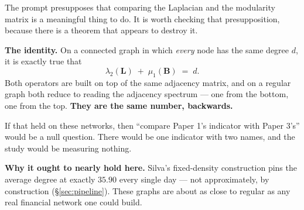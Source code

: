 \documentclass[11pt,a4paper]{article}
\newcommand{\Lap}{\mathbf{L}}
\newcommand{\Bmat}{\mathbf{B}}
\begin{document}
The prompt presupposes that comparing the Laplacian and the modularity matrix
is a meaningful thing to do. It is worth checking that presupposition, because
there is a theorem that appears to destroy it.

\textbf{The identity.} On a connected graph in which \emph{every} node has the
same degree $d$, it is exactly true that
\[
  \lambda_2(\Lap) \;+\; \mu_1(\Bmat) \;=\; d .
\]
Both operators are built on top of the same adjacency matrix, and on a regular
graph both reduce to reading the adjacency spectrum --- one from the bottom, one
from the top. \textbf{They are the same number, backwards.}

If that held on these networks, then ``compare Paper 1's indicator with Paper
3's'' would be a null question. There would be one indicator with two names, and
the study would be measuring nothing.

\textbf{Why it ought to nearly hold here.} Silva's fixed-density construction
pins the average degree at exactly $35.90$ every single day --- not
approximately, by construction (\S\ref{sec:pipeline}). These graphs are about as
close to regular as any real financial network one could build.
\end{document}
